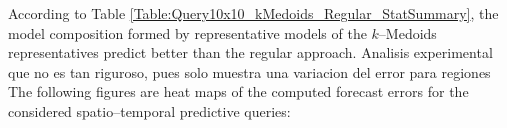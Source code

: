 According to Table \ref{Table:Query10x10_kMedoids_Regular_StatSummary}, the model composition formed by representative models of the $k$--Medoids representatives predict better than the regular approach. Analisis experimental que no es tan riguroso, pues solo muestra una variacion del error para regiones 
The following figures are heat maps of the computed forecast errors for the considered spatio--temporal predictive queries:

\begin{figure}[ht]
	\hfill 	
\end{figure}
